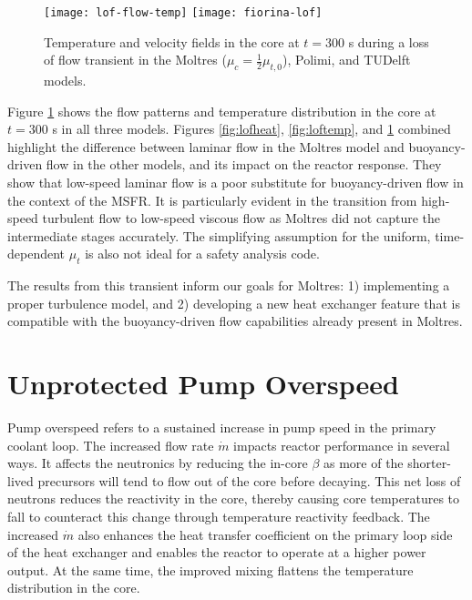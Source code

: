 \begin{figure}[htbp!]
    \centering
    \texttt{[image: lof-flow-temp]}
    \texttt{[image: fiorina-lof]}
    \caption{Temperature and velocity fields in the core at $t=300$ s during
    a loss of flow transient in the Moltres ($\mu_c = \frac{1}{2} \mu_{t,0}$),
    Polimi, and TUDelft models.}
    \label{fig:lofflowtemp}
\end{figure}

Figure \ref{fig:lofflowtemp} shows the flow patterns and temperature
distribution in the core at $t=300$ s in all three models. Figures
\ref{fig:lofheat}, \ref{fig:loftemp}, and \ref{fig:lofflowtemp} combined
highlight the difference between laminar flow in the Moltres model and
buoyancy-driven flow in the other models, and its impact on the reactor
response. They show that low-speed laminar flow is a poor substitute for
buoyancy-driven flow in the context of the MSFR. It is particularly evident
in the transition from high-speed turbulent flow to low-speed viscous
flow as Moltres did not capture the intermediate stages accurately. The
simplifying assumption for the uniform, time-dependent $\mu_t$ is also not
ideal for a safety analysis code.

The results from this transient inform our goals for Moltres: 1)
implementing a proper turbulence model, and
2) developing a new heat exchanger feature that is compatible with the
buoyancy-driven flow capabilities already present in Moltres.

\clearpage

\section{Unprotected Pump Overspeed}

Pump overspeed refers to a sustained
increase in pump speed in the primary coolant loop. The increased flow rate
$\dot{m}$ impacts reactor performance in several ways.
It affects the neutronics by reducing the in-core $\beta$ as more of the
shorter-lived precursors will tend to flow out of the core before decaying.
This net loss of neutrons reduces the reactivity in the core, thereby causing
core temperatures to fall to counteract this change through temperature
reactivity feedback. The increased $\dot{m}$ also enhances the heat transfer
coefficient on the primary loop side of the heat exchanger and enables the
reactor to operate at a higher power output. At the same time, the improved
mixing flattens the temperature distribution in the core.

